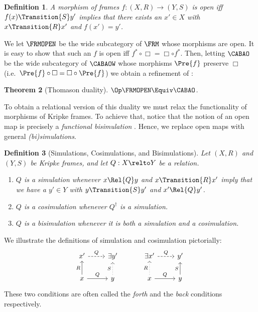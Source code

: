 \documentclass[10pt,a4paper]{article}
\newtheorem{theorem}{Theorem}
\newtheorem{definition}[theorem]{Definition}
\begin{document}
\begin{definition}
  A morphism of frames \(f : (X, R) \to (Y, S)\) is \emph{open} iff
  $f(x) \Transition{S} y'$ implies that there exists an $x' \in X$ with
  $x \Transition{R} x'$ and $f(x') = y'$.
\end{definition}

We let $\FRMOPEN$ be the wide subcategory of $\FRM$ whose morphisms
are open.  It is easy to show that such an $f$ is open iff
\(f^* \circ \Box = \Box \circ f^*\). Then, letting $\CABAO$ be the
wide subcategory of $\CABAOW$ whose morphisms $\Pre{f}$ preserve
$\Box$ (i.e.\ $\Pre{f} \circ \Box = \Box \circ \Pre{f}$) we obtain a
refinement of :

\begin{theorem}[Thomason duality]
  \label{theorem:open-thomason}
  $\Op\FRMOPEN \Equiv \CABAO$.
\end{theorem}

To obtain a relational version of this duality we must relax the functionality
of morphisms of Kripke frames. To achieve that, notice that the notion of an
open map is precisely a \emph{functional bisimulation} \cite[\S
3.2]{sangiorgi_2009}. Hence, we replace open maps with general
\emph{(bi)simulations}.

\begin{definition}[Simulations, Cosimulations, and Bisimulations]
  Let $(X, R)$ and $(Y, S)$ be Kripke frames, and let $Q : X \relto Y$ be a
  relation.
  \begin{enumerate}
    \item $Q$ is a \emph{simulation} whenever \(x \Rel{Q} y\) and \(x
      \Transition{R} x'\) imply that we have a \(y' \in Y\) with \(y
      \Transition{S} y'\) and \(x' \Rel{Q} y'\).
    \item $Q$ is a \emph{cosimulation} whenever $Q^\dagger$ is a simulation.
    \item $Q$ is a \emph{bisimulation} whenever it is both a simulation and a
          cosimulation.
  \end{enumerate}
\end{definition}

We illustrate the definitions of simulation and cosimulation pictorially:
\[
  \begin{tikzcd}
    x' \ar[r,dashed,"Q"] & {\exists y'} \\
    x \ar[u,"R"] \ar[r,"Q"] & y \ar[u,dotted,"S"]
  \end{tikzcd}
  \quad\quad\quad
  \begin{tikzcd}
    {\exists x'} \ar[r,dashed,"Q"] & y' \\
    x \ar[u,dotted,"R"] \ar[r,"Q"] & y \ar[u,"S"]
  \end{tikzcd}
\]
These two conditions are often called the \emph{forth} and the \emph{back}
conditions respectively.
\end{document}
